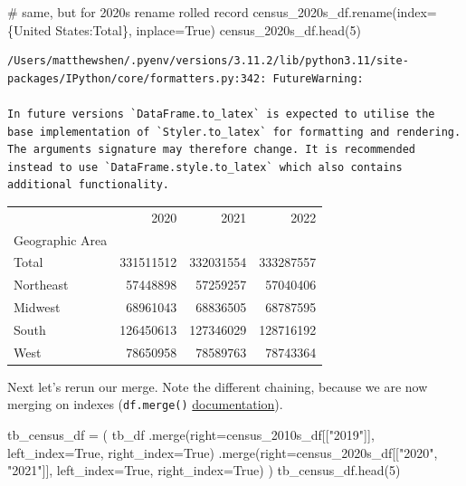 \documentclass[
  letterpaper,
  DIV=11,
  numbers=noendperiod]{scrreprt}
\newenvironment{Shaded}{\begin{snugshade}}{\end{snugshade}}
\newcommand{\CommentTok}[1]{\textcolor[rgb]{0.37,0.37,0.37}{#1}}
\newcommand{\DecValTok}[1]{\textcolor[rgb]{0.68,0.00,0.00}{#1}}
\newcommand{\NormalTok}[1]{\textcolor[rgb]{0.00,0.23,0.31}{#1}}
\newcommand{\OperatorTok}[1]{\textcolor[rgb]{0.37,0.37,0.37}{#1}}
\newcommand{\StringTok}[1]{\textcolor[rgb]{0.13,0.47,0.30}{#1}}
\newcommand{\VariableTok}[1]{\textcolor[rgb]{0.07,0.07,0.07}{#1}}
\begin{document}
\begin{Shaded}
\begin{Highlighting}[]
\CommentTok{\# same, but for 2020s rename rolled record}
\NormalTok{census\_2020s\_df.rename(index}\OperatorTok{=}\NormalTok{\{}\StringTok{\textquotesingle{}United States\textquotesingle{}}\NormalTok{:}\StringTok{\textquotesingle{}Total\textquotesingle{}}\NormalTok{\}, inplace}\OperatorTok{=}\VariableTok{True}\NormalTok{)}
\NormalTok{census\_2020s\_df.head(}\DecValTok{5}\NormalTok{)}
\end{Highlighting}
\end{Shaded}

\begin{verbatim}
/Users/matthewshen/.pyenv/versions/3.11.2/lib/python3.11/site-packages/IPython/core/formatters.py:342: FutureWarning:

In future versions `DataFrame.to_latex` is expected to utilise the base implementation of `Styler.to_latex` for formatting and rendering. The arguments signature may therefore change. It is recommended instead to use `DataFrame.style.to_latex` which also contains additional functionality.
\end{verbatim}

\begin{tabular}{lrrr}
\toprule
{} &       2020 &       2021 &       2022 \\
Geographic Area &            &            &            \\
\midrule
Total           &  331511512 &  332031554 &  333287557 \\
Northeast       &   57448898 &   57259257 &   57040406 \\
Midwest         &   68961043 &   68836505 &   68787595 \\
South           &  126450613 &  127346029 &  128716192 \\
West            &   78650958 &   78589763 &   78743364 \\
\bottomrule
\end{tabular}

Next let's rerun our merge. Note the different chaining, because we are
now merging on indexes (\texttt{df.merge()}
\href{https://pandas.pydata.org/docs/reference/api/pandas.DataFrame.merge.html}{documentation}).

\begin{Shaded}
\begin{Highlighting}[]
\NormalTok{tb\_census\_df }\OperatorTok{=}\NormalTok{ (}
\NormalTok{    tb\_df}
\NormalTok{    .merge(right}\OperatorTok{=}\NormalTok{census\_2010s\_df[[}\StringTok{"2019"}\NormalTok{]],}
\NormalTok{           left\_index}\OperatorTok{=}\VariableTok{True}\NormalTok{, right\_index}\OperatorTok{=}\VariableTok{True}\NormalTok{)}
\NormalTok{    .merge(right}\OperatorTok{=}\NormalTok{census\_2020s\_df[[}\StringTok{"2020"}\NormalTok{, }\StringTok{"2021"}\NormalTok{]],}
\NormalTok{           left\_index}\OperatorTok{=}\VariableTok{True}\NormalTok{, right\_index}\OperatorTok{=}\VariableTok{True}\NormalTok{)}
\NormalTok{)}
\NormalTok{tb\_census\_df.head(}\DecValTok{5}\NormalTok{)}
\end{Highlighting}
\end{Shaded}
\end{document}
